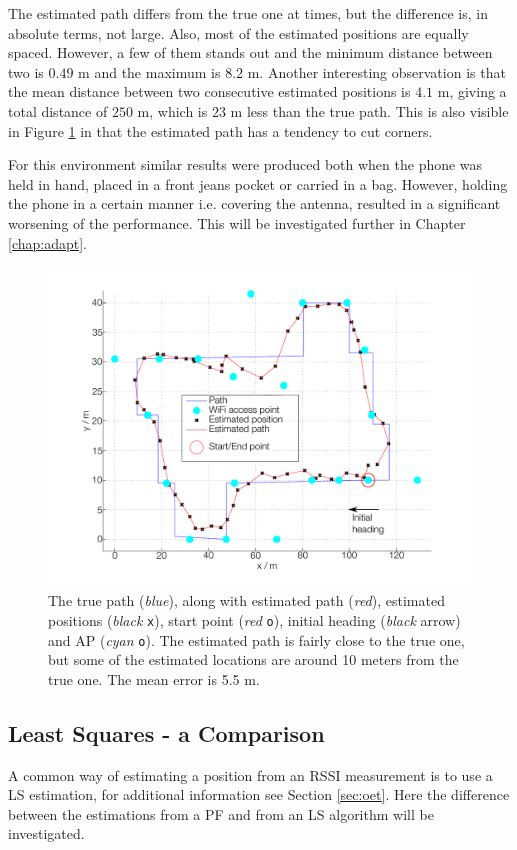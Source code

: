 \documentclass{LTHthesis}
\begin{document}
The estimated path differs from the true one at times, but the difference is, in absolute terms, not large. Also, most of the estimated positions are equally spaced. However, a few of them stands out and the minimum distance between two is $0.49$ m and the maximum is $8.2$ m. Another interesting observation is that the mean distance between two consecutive estimated positions is $4.1$ m, giving a total distance of $250$ m, which is $23$ m less than the true path. This is also visible in Figure \ref{true_vs_est_env_3} in that the estimated path has a tendency to cut corners.

For this environment similar results were produced both when the phone was held in hand, placed in a front jeans pocket  or carried in a bag. However, holding the phone in a certain manner i.e. covering the antenna, resulted in a significant worsening of the performance. This will be investigated further in Chapter \ref{chap:adapt}.        
%
\begin{figure}[!hbt]

\includegraphics[width=1\textwidth ]{images/pure_rssi/true_vs_est_env_3}
\caption{The true path (\emph{blue}), along with estimated path (\emph{red}), estimated positions (\emph{black} \texttt{x}), start point (\emph{red} \texttt{o}), initial heading (\emph{black} arrow) and AP (\emph{cyan} \texttt{o}). The estimated path is fairly close to the true one, but some of the estimated locations are around 10 meters from the true one. The  mean error is 5.5 m.}\label{true_vs_est_env_3}
\end{figure}
%
\subsection{Least Squares - a Comparison}
%
A common way of estimating a position from an RSSI measurement is to use a LS estimation, for additional information see Section \ref{sec:oet}. Here the difference between the estimations from a PF and from an LS algorithm will be investigated. 
\end{document}
